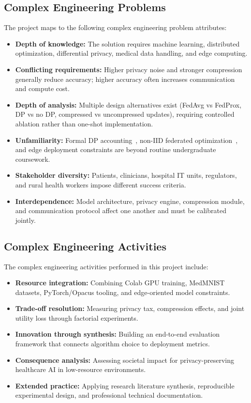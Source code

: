 \subsection{Complex Engineering Problems}
The project maps to the following complex engineering problem attributes:
\begin{itemize}[leftmargin=*]
  \item \textbf{Depth of knowledge:} The solution requires machine learning,
        distributed optimization, differential privacy, medical data
        handling, and edge computing.
  \item \textbf{Conflicting requirements:} Higher privacy noise and stronger
        compression generally reduce accuracy; higher accuracy often
        increases communication and compute cost.
  \item \textbf{Depth of analysis:} Multiple design alternatives exist
        (FedAvg vs FedProx, DP vs no DP, compressed vs uncompressed
        updates), requiring controlled ablation rather than one-shot
        implementation.
  \item \textbf{Unfamiliarity:} Formal DP accounting~\cite{mironov2017renyi},
        non-IID federated optimization~\cite{yuan2022convergence}, and edge
        deployment constraints are beyond routine undergraduate coursework.
  \item \textbf{Stakeholder diversity:} Patients, clinicians, hospital IT
        units, regulators, and rural health workers impose different success
        criteria.
  \item \textbf{Interdependence:} Model architecture, privacy engine,
        compression module, and communication protocol affect one another
        and must be calibrated jointly.
\end{itemize}

\subsection{Complex Engineering Activities}
The complex engineering activities performed in this project include:
\begin{itemize}[leftmargin=*]
  \item \textbf{Resource integration:} Combining Colab GPU training,
        MedMNIST datasets, PyTorch/Opacus tooling, and edge-oriented model
        constraints.
  \item \textbf{Trade-off resolution:} Measuring privacy tax, compression
        effects, and joint utility loss through factorial experiments.
  \item \textbf{Innovation through synthesis:} Building an end-to-end
        evaluation framework that connects algorithm choice to deployment
        metrics.
  \item \textbf{Consequence analysis:} Assessing societal impact for
        privacy-preserving healthcare AI in low-resource environments.
  \item \textbf{Extended practice:} Applying research literature synthesis,
        reproducible experimental design, and professional technical
        documentation.
\end{itemize}

